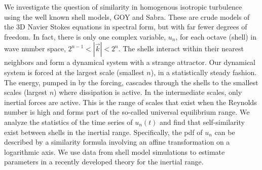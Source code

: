 
We investigate the question of similarity in homogenous isotropic turbulence using the well known shell models, GOY and Sabra.  These are crude models of the 3D Navier Stokes equations in spectral form, but with far fewer degrees of freedom.  In fact, there is only one complex variable, $u_n$, for each octave (shell) in wave number space, $2^{n-1}<|\vec{k}|<2^{n}$.  The shells interact within their nearest neighbors and form a dynamical system with a strange attractor.  Our dynamical system is forced at the largest scale (smallest $n$), in a statistically steady fashion. The energy, pumped in by the forcing, cascades through the shells to the smallest scales (largest $n$) where dissipation is active.  In the intermediate scales, only inertial forces are active.  This is the range of scales that exist when the Reynolds number is high and forms part of the so-called universal equilibrium range.  We analyze the statistics of the time series of $u_n(t)$ and find that self-similarity exist between shells in the inertial range. Specifically, the pdf of $u_n$ can be described by a similarity formula involving an affine transformation on a logarithmic axis. We use data from shell model simulations to estimate parameters in a recently developed theory for the inertial range.
